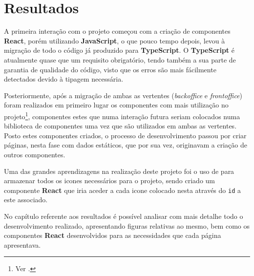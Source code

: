 \section{Resultados}

A primeira interação com o projeto começou com a criação de componentes \textbf{React}, porém utilizando \textbf{JavaScript}, o que pouco tempo depois, levou à migração de todo o código já produzido para \textbf{TypeScript}. O \textbf{TypeScript} é atualmente quase que um requisito obrigatório, tendo também a sua parte de garantia de qualidade do código, visto que os erros são mais fácilmente detectados devido à tipagem necessária.

Posteriormente, após a migração de ambas as vertentes (\textit{backoffice} e \textit{frontoffice}) foram realizados em primeiro lugar os componentes com mais utilização no projeto\footnote{Ver .}, componentes estes que numa interação futura seriam colocados numa biblioteca de componentes uma vez que são utilizados em ambas as vertentes. Posto estes componentes criados, o processo de desenvolvimento passou por criar páginas, nesta fase com dados estáticos, que por sua vez, originavam a criação de outros componentes.

Uma das grandes aprendizagens na realização deste projeto foi o uso de  \textbf{} para armazenar todos os icones necessários para o projeto, sendo criado um componente \textbf{React} que iria aceder a cada icone colocado nesta  através do \texttt{id} a este associado.

No capítulo referente aos resultados é possível analisar com mais detalhe todo o desenvolvimento realizado, apresentando figuras relativas ao mesmo, bem como os componentes \textbf{React} desenvolvidos para as necessidades que cada página apresentava.